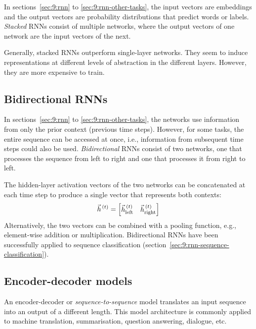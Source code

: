 In sections~\ref{sec:9:rnn} to \ref{sec:9:rnn-other-tasks}, the input vectors
are embeddings and the output vectors are probability distributions that predict
words or labels.
\textit{Stacked} RNNs consist of multiple networks, where the output vectors of
one network are the input vectors of the next.

Generally, stacked RNNs outperform single-layer networks.
They seem to induce representations at different levels of abstraction in the
different layers.
However, they are more expensive to train.

\subsection{Bidirectional RNNs}

In sections~\ref{sec:9:rnn} to \ref{sec:9:rnn-other-tasks}, the networks use
information from only the prior context (previous time steps).
However, for some tasks, the entire sequence can be accessed at once, i.e.,
information from subsequent time steps could also be used.
\textit{Bidirectional} RNNs consist of two networks, one that processes the
sequence from left to right and one that processes it from right to left.

The hidden-layer activation vectors of the two networks can be concatenated at
each time step to produce a single vector that represents both contexts:
\begin{equation}
  \vec{h}^{\,(t)} = \begin{bmatrix}
    \vec{h}^{\,(t)}_\text{left} & \vec{h}^{\,(t)}_\text{right}
  \end{bmatrix}
\end{equation}
Alternatively, the two vectors can be combined with a pooling function, e.g.,
element-wise addition or multiplication.
Bidirectional RNNs have been successfully applied to sequence classification
(section~\ref{sec:9:rnn-sequence-classification}).

\subsection{Encoder-decoder models}

An encoder-decoder or \textit{sequence-to-sequence} model translates an input
sequence into an output of a different length.
This model architecture is commonly applied to machine translation,
summarisation, question answering, dialogue, etc.

